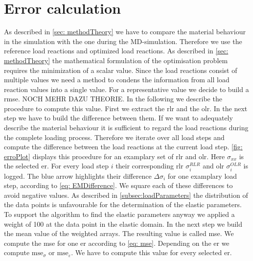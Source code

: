     \section{Error calculation}\label{sec: errorCalculation}
    As described in \autoref{sec: methodTheory} we have to compare the material behaviour in the  simulation with the one during the MD-simulation. Therefore we use the reference load reactions and optimized load reactions. As described in \autoref{sec: methodTheory} the mathematical formulation of the optimisation problem requires the minimization of a scalar value. Since the load reactions consist of multiple values we need a method to condens the information from all load reaction values into a single value.  For a representative value we decide to build a \acrlong{rmse}. NOCH MEHR DAZU THEORIE. In the following we describe the procedure to compute this value.
    First we extract the \acrshort{rlr} and the \acrshort{olr}. In the next step we have to build the difference between them.  If we want to adequately describe the material behaviour it is sufficient to regard the load reactions during the complete loading process. Therefore we iterate over all load steps and compute the difference between the load reactions at the current load step. \autoref{fig: erroPlot} displays this procedure for an examplary set of \acrshort{rlr} and \acrshort{olr}. Here $\sigma_{xx}$ is the selected \acrlong{er}. For every load step $i$ their corresponding \acrshort{rlr} $\sigma_{i}^{\scriptscriptstyle RLR}$ and \acrshort{olr} $\sigma_{i}^{\scriptscriptstyle OLR}$ is logged. The blue arrow highlights their difference $\Delta\sigma_{i}$ for one examplary load step, according to \autoref{eq: EMDifference}. We square each of these differences to avoid negative values.  As described in \autoref{subsec:loadParameters} the distribution of the data points is unfavourable for the determination of the elastic parameters. To support the algorithm to find the elastic parameters anyway we applied a weight of 100 at the data point in the elastic domain. In the next step we build the mean value of the weighted arrays. The resulting value is called \acrfull{mse}. We compute the \acrshort{mse} for one \acrlong{er} according to \autoref{eq: mse}. Depending on the \acrlong{er} we compute $\text{mse}_{\sigma}$ or $\text{mse}_{\varepsilon}$. We have to compute this value for every selected \acrlong{er}. 

